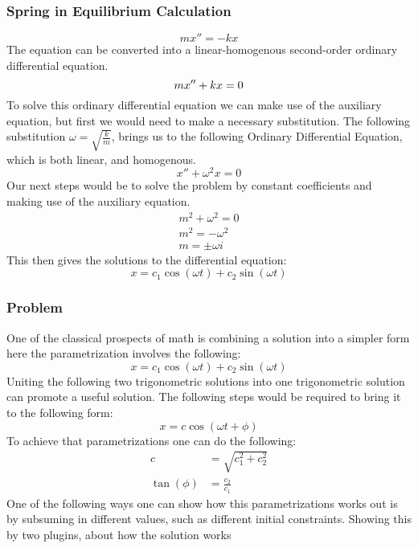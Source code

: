 \documentclass[11pt]{article} %
\begin{document}
\newpage

\subsubsection{Spring in Equilibrium Calculation}
\begin{equation} mx''=-kx\end{equation} The equation can be converted into a linear-homogenous second-order ordinary differential equation. \begin{equation} mx''+kx=0\\ \end{equation} To solve this ordinary differential equation we can make use of the auxiliary equation, but first we would need to make a necessary substitution. The following substitution $\omega=\sqrt{\frac km}$, brings us to the following Ordinary Differential Equation, which is both linear, and homogenous. \begin{equation}x''+\omega^2x=0 \end{equation} Our next steps would be to solve the problem by constant coefficients and making use of the auxiliary equation. \begin{align*}m^2+\omega^2=0 \\ m^2=-\omega^2 \\ m = \pm\omega i\end{align*} This then gives the solutions to the differential equation: \begin{equation} x=c_1\cos(\omega t)+c_2\sin(\omega t)\end{equation}
\newpage
\subsubsection{Problem}
One of the classical prospects of math is combining a solution into a simpler form here the parametrization involves the following: \begin{equation} x=c_1\cos(\omega t)+c_2\sin(\omega t) \end{equation} Uniting the following two trigonometric solutions into one trigonometric solution can promote a useful solution. The following steps would be required to bring it to the following form: \begin{equation}x=c\cos(\omega t +\phi) \end{equation} To achieve that parametrizations one can do the following: \begin{align*}c&=\sqrt{c_1^2+c_2^2} \\ \tan(\phi)&=\frac{c_2}{c_1} \end{align*} One of the following ways one can show how this parametrizations works out is by subsuming in different values, such as different initial constraints. Showing this by two plugins, about how the solution works
\newpage
\end{document}
